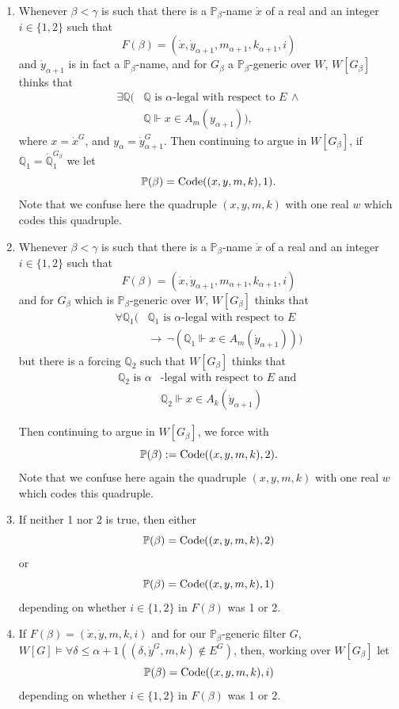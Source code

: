 \documentclass[10pt,a4paper]{amsart}
\newcommand{\forceP}{\mathbb{P}}
\newcommand{\forceQ}{\mathbb{Q}}
\begin{document}
\begin{enumerate}
\item Whenever $\beta < \gamma $ is such that there is a $\forceP_{\beta}$-name $\dot{x}$ of a real and an integer $ i\in\{1,2\}$ such that
\[F(\beta)= (\dot{x},\dot{y}_{\alpha+1},m_{\alpha+1},k_{\alpha+1},i)\] and $\dot{y}_{\alpha+1}$ is in fact a $\forceP_{\beta}$-name, and for $G_{\beta}$  a $\forceP_{\beta}$-generic over $W$, $W[G_{\beta}]$ thinks that
\begin{align*}
\exists \forceQ (&\forceQ \text{ is } \alpha \text{-legal with respect to } E \,  \land \\& \forceQ \Vdash x \in A_m({y}_{\alpha+1})),
\end{align*}
where $x=\dot{x}^G$, and $y_{\alpha}=\dot{y}_{\alpha+1}^G$.
Then continuing to argue in $W[G_{\beta}]$, if ${\forceQ}_1=\dot{\forceQ}_1^{G_{\beta}}$ we let
\[\forceP(\beta)= \hbox{Code}((x,y,m,k),1). \]  Note that we confuse here the quadruple $(x,y,m,k)$ with one real $w$ which codes this quadruple.

\item
Whenever $\beta < \gamma $ is such that there is a $\forceP_{\beta}$-name $\dot{x}$ of a real and an integer $ i \in \{1, 2\}$ such that
\[F(\beta)= (\dot{x},\dot{y}_{\alpha+1},m_{\alpha+1},k_{\alpha+1}, i)\] and for $G_{\beta}$ which is $\forceP_{\beta}$-generic over $W$, $W[G_{\beta}]$ thinks that
\begin{align*}
\forall \forceQ_1 (&\forceQ_1 \text{ is } \alpha \text{-legal with respect to } E   \\& \rightarrow \, \lnot(\forceQ_1 \Vdash x \in A_m(\dot{y}_{\alpha+1})))
\end{align*}
but there is a forcing $\forceQ_2$ such that $W[G_{\beta}]$ thinks that 
\begin{align*}
\forceQ_{2} \text{ is } \alpha &\text{-legal with respect to $E$ and } \\ & {\forceQ_2} \Vdash x \in A_k( \dot{y}_{\alpha+1} )
\end{align*}


Then continuing to argue in $W[G_{\beta}]$, we force with
\[\forceP(\beta):= \hbox{Code}((x,y,m,k),2).\]  Note that we confuse here again the quadruple $(x,y,m,k)$ with one real $w$ which codes this quadruple.




\item If neither 1 nor 2 is true, then either \[ \forceP(\beta)=\hbox{Code}((x,y,m,k),2)\] or 
\[ \forceP(\beta)=\hbox{Code}((x,y,m,k),1)\] depending on whether $ i\in\{1,2\}$ in $F(\beta)$ was 1 or 2. 

\item 
If $F(\beta) = (\dot{x},\dot{y},m,k,i)$ and for our $\forceP_{\beta}$-generic filter $G$, $W[G] \models \forall \delta \le \alpha+1 ((\delta,\dot{y}^G,m,k) \notin E^G)$,
then, working over $W[G_{\beta}]$ let
\[ \forceP(\beta)=\hbox{Code}((x,y,m,k),i)\] depending on whether $ i\in\{1,2\}$ in $F(\beta)$ was 1 or 2.
\end{enumerate} 
\end{document}
